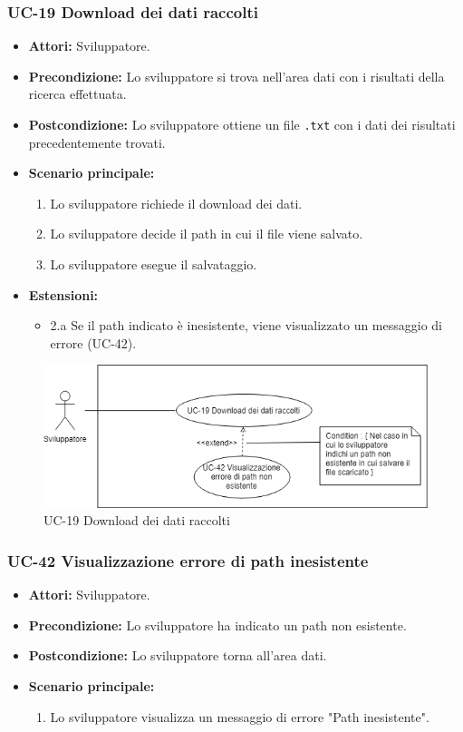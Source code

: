 	\subsubsection{UC-19 Download dei dati raccolti}
		\begin{itemize}
			\item \textbf{Attori:} Sviluppatore.
			\item \textbf{Precondizione:} Lo sviluppatore si trova nell'area dati con i risultati della ricerca effettuata.
			\item \textbf{Postcondizione:} Lo sviluppatore ottiene un file \texttt{.txt} con i dati dei risultati precedentemente trovati.
			\item \textbf{Scenario principale:}
				\begin{enumerate}
					\item Lo sviluppatore richiede il download dei dati.
					\item Lo sviluppatore decide il path in cui il file viene salvato.
					\item Lo sviluppatore esegue il salvataggio.
				\end{enumerate}
			\item \textbf{Estensioni:}
				\begin{itemize}
					\item 2.a Se il path indicato è inesistente, viene visualizzato un messaggio di errore (UC-42).
				\end{itemize}
		\end{itemize}
		\begin{figure}[h]
			\centering
			\includegraphics[scale=0.7]{images/UC-19.png}
			\caption{UC-19 Download dei dati raccolti}
		\end{figure}	

	\subsubsection{UC-42 Visualizzazione errore di path inesistente}
		\begin{itemize}					
			\item \textbf{Attori:} Sviluppatore.
			\item \textbf{Precondizione:} Lo sviluppatore ha indicato un path non esistente.
			\item \textbf{Postcondizione:} Lo sviluppatore torna all'area dati.
			\item \textbf{Scenario principale:}
				\begin{enumerate}
					\item Lo sviluppatore visualizza un messaggio di errore "Path inesistente".
				\end{enumerate}	
		\end{itemize}				
				
